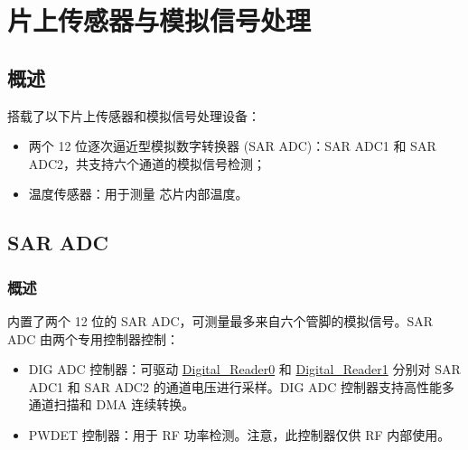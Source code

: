 \documentclass[main\_\_CN.tex]{subfiles}
\begin{document}

\ifglobal
\else
    {\let\clearpage\relax \listoftodos}
    \tableofcontents
\fi



\hypertarget{sensor}{}
\chapter{片上传感器与模拟信号处理}
\label{mod:sensor}


\section{概述}

\chipname{} 搭载了以下片上传感器和模拟信号处理设备：

\begin{itemize}
    \item 两个 12 位逐次逼近型模拟数字转换器 (SAR ADC)：SAR ADC1 和 SAR ADC2，共支持六个通道的模拟信号检测；
    \item 温度传感器：用于测量 \chipname{} 芯片内部温度。
    
\end{itemize}

\section{SAR ADC}\label{sec:sensor-sar-adc}

\subsection{概述}

\chipname{} 内置了两个 12 位的 SAR ADC，可测量最多来自六个管脚的模拟信号。SAR ADC 由两个专用控制器控制：

\begin{itemize}
    \item DIG ADC 控制器：可驱动 \hyperref[other:sensor-item-read-data-from-sar-adc1]{Digital\_Reader0} 和 \hyperref[other:sensor-item-read-data-from-sar-adc1]{Digital\_Reader1} 分别对 SAR ADC1 和 SAR ADC2 的通道电压进行采样。DIG ADC 控制器支持高性能多通道扫描和 DMA 连续转换。
    \item PWDET 控制器：用于 RF 功率检测。注意，此控制器仅供 RF 内部使用。
    
\end{itemize}
\end{document}
